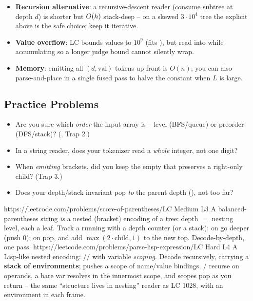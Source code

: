 \begin{hardeningbox}
\begin{itemize}[nosep, leftmargin=1.4em]
  \item \textbf{Recursion alternative}: a recursive-descent reader (consume subtree at depth
        $d$) is shorter but $O(h)$ stack-deep -- on a skewed $3\cdot10^4$ tree the explicit
         above is the safe choice; keep it iterative.
  \item \textbf{Value overflow}: LC bounds values to $10^9$ (fits ), but read into
         while accumulating so a longer judge bound cannot silently wrap.
  \item \textbf{Memory}: emitting all $(d,\text{val})$ tokens up front is $O(n)$; you can also
        parse-and-place in a single fused pass to halve the constant when $L$ is large.
\end{itemize}
\end{hardeningbox}

\subsection{Practice Problems}

\begin{stuckbox}
\begin{itemize}[nosep, leftmargin=1.4em]
  \item Are you sure which \emph{order} the input array is -- level (BFS/queue) or preorder
        (DFS/stack)? (, Trap 2.)
  \item In a string reader, does your tokenizer read a \emph{whole} integer, not one digit?
  \item When \emph{emitting} brackets, did you keep the empty \code{()} that preserves a
        right-only child? (Trap 3.)
  \item Does your depth/stack invariant pop \emph{to} the parent depth (), not
        too far?
\end{itemize}
\end{stuckbox}

\begin{practiceset}
    {https://leetcode.com/problems/score-of-parentheses/}{LC Medium L3}
    {A balanced-parentheses string \emph{is} a nested (bracket) encoding of a tree: depth $=$
    nesting level, each \code{()} a leaf. Track a running  with a depth counter (or a
    stack): on \code{(} go deeper (push $0$); on \code{)} pop, and add $\max(2\cdot\text{child},1)$
    to the new top. Decode-by-depth, one pass.}
    {https://leetcode.com/problems/parse-lisp-expression/}{LC Hard L4}
    {A Lisp-like nested encoding: // with variable \emph{scoping}.
    Decode recursively, carrying a \textbf{stack of environments};  pushes a scope of
    name/value bindings, / recurse on operands, a bare var resolves in the
    innermost scope, and scopes pop as you return -- the same ``structure lives in nesting''
    reader as LC 1028, with an environment in each frame.}
\end{practiceset}

